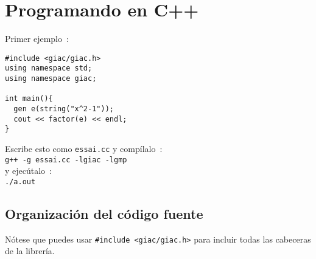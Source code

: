 \documentclass{article}
\begin{document}
\section{Programando en C++}
Primer ejemplo~:
\begin{verbatim}
#include <giac/giac.h>
using namespace std;
using namespace giac;

int main(){
  gen e(string("x^2-1"));
  cout << factor(e) << endl;
}
\end{verbatim}
Escribe esto como {\tt essai.cc} y comp\'ilalo~:\\
{\tt g++ -g essai.cc -lgiac -lgmp}\\
y ejec\'utalo~:\\
{\tt ./a.out}

\subsection{Organizaci\'on del c\'odigo fuente}
N\'otese que puedes usar \verb|#include <giac/giac.h>| para incluir todas las cabeceras de la librer\'ia.
\end{document}
